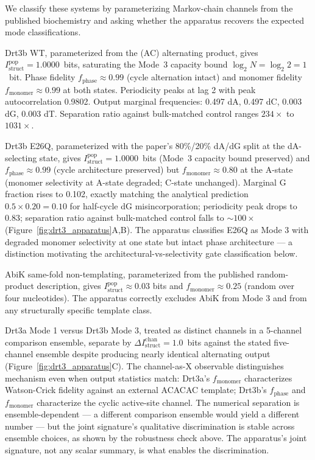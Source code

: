 \documentclass[aps,prx,reprint,amsmath,amssymb,floatfix,superscriptaddress,nofootinbib]{revtex4-2}
\theoremstyle{plain-thm}
\theoremstyle{definition-thm}
\newcommand{\Istructpop}{I_{\mathrm{struct}}^{\mathrm{pop}}}
\newcommand{\Istructchan}{I_{\mathrm{struct}}^{\mathrm{chan}}}
\newcommand{\fphase}{f_{\mathrm{phase}}}
\newcommand{\fmonomer}{f_{\mathrm{monomer}}}
\begin{document}
We classify these systems by parameterizing Markov-chain channels from the published biochemistry and asking whether the apparatus recovers the expected mode classifications.

Drt3b WT, parameterized from the (AC) alternating product, gives $\Istructpop = 1.0000$~bits, saturating the Mode~3 capacity bound $\log_2 N = \log_2 2 = 1$~bit. Phase fidelity $\fphase \approx 0.99$ (cycle alternation intact) and monomer fidelity $\fmonomer \approx 0.99$ at both states. Periodicity peaks at lag 2 with peak autocorrelation 0.9802. Output marginal frequencies: 0.497 dA, 0.497 dC, 0.003 dG, 0.003 dT. Separation ratio against bulk-matched control ranges $234\times$ to $1031\times$.

Drt3b E26Q, parameterized with the paper's 80\%/20\% dA/dG split at the dA-selecting state, gives $\Istructpop = 1.0000$~bits (Mode~3 capacity bound preserved) and $\fphase \approx 0.99$ (cycle architecture preserved) but $\fmonomer \approx 0.80$ at the A-state (monomer selectivity at A-state degraded; C-state unchanged). Marginal G fraction rises to 0.102, exactly matching the analytical prediction $0.5 \times 0.20 = 0.10$ for half-cycle dG misincorporation; periodicity peak drops to 0.83; separation ratio against bulk-matched control falls to $\sim 100\times$ (Figure~\ref{fig:drt3_apparatus}A,B). The apparatus classifies E26Q as Mode 3 with degraded monomer selectivity at one state but intact phase architecture --- a distinction motivating the architectural-vs-selectivity gate classification below.

AbiK same-fold non-templating, parameterized from the published random-product description, gives $\Istructpop \approx 0.03$ bits and $\fmonomer \approx 0.25$ (random over four nucleotides). The apparatus correctly excludes AbiK from Mode 3 and from any structurally specific template class.

Drt3a Mode 1 versus Drt3b Mode 3, treated as distinct channels in a 5-channel comparison ensemble, separate by $\Delta\Istructchan = 1.0$~bits against the stated five-channel ensemble despite producing nearly identical alternating output (Figure~\ref{fig:drt3_apparatus}C). The channel-as-X observable distinguishes mechanism even when output statistics match: Drt3a's $\fmonomer$ characterizes Watson-Crick fidelity against an external ACACAC template; Drt3b's $\fphase$ and $\fmonomer$ characterize the cyclic active-site channel. The numerical separation is ensemble-dependent --- a different comparison ensemble would yield a different number --- but the joint signature's qualitative discrimination is stable across ensemble choices, as shown by the robustness check above. The apparatus's joint signature, not any scalar summary, is what enables the discrimination.
\end{document}
